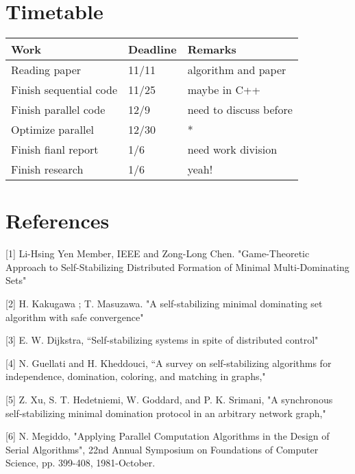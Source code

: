 \documentclass[sigconf]{acmart}
\begin{document}
\section{Timetable}
\begin{tabular}[t]{lll}
	\hline
	Work & Deadline & Remarks\\
	\hline
	Reading paper & 11/11 & algorithm and paper \\
	Finish sequential code & 11/25 & maybe in C++ \\
	Finish parallel code & 12/9 & need to discuss before \\
	Optimize parallel & 12/30 & * \\
	Finish fianl report & 1/6 & need work division \\
	Finish research & 1/6 & yeah! \\
	\hline
\end{tabular}

\section{References}
[1] Li-Hsing Yen Member, IEEE and Zong-Long Chen. "Game-Theoretic Approach to Self-Stabilizing Distributed Formation of Minimal Multi-Dominating Sets"

[2] H. Kakugawa ; T. Masuzawa. "A self-stabilizing minimal dominating set algorithm with safe convergence"

[3] E. W. Dijkstra, “Self-stabilizing systems in spite of distributed
control"

[4] N. Guellati and H. Kheddouci, “A survey on self-stabilizing
algorithms for independence, domination, coloring, and matching
in graphs,"

[5] Z. Xu, S. T. Hedetniemi, W. Goddard, and P. K. Srimani, "A
synchronous self-stabilizing minimal domination protocol in an
arbitrary network graph,"

[6] N. Megiddo, "Applying Parallel Computation Algorithms in the Design of Serial Algorithms", 22nd Annual Symposium on Foundations of Computer Science, pp. 399-408, 1981-October.
\end{document}
